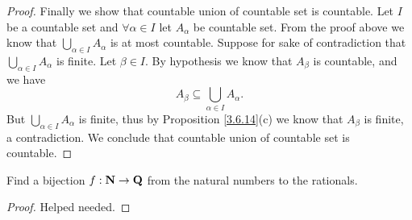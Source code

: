 \begin{proof}
    Finally we show that countable union of countable set is countable.
    Let \(I\) be a countable set and \(\forall \alpha \in I\) let \(A_{\alpha}\) be countable set.
    From the proof above we know that \(\bigcup_{\alpha \in I} A_{\alpha}\) is at most countable.
    Suppose for sake of contradiction that \(\bigcup_{\alpha \in I} A_{\alpha}\) is finite.
    Let \(\beta \in I\).
    By hypothesis we know that \(A_{\beta}\) is countable, and we have
    \[
        A_{\beta} \subseteq \bigcup_{\alpha \in I} A_{\alpha}.
    \]
    But \(\bigcup_{\alpha \in I} A_{\alpha}\) is finite, thus by Proposition \ref{3.6.14}(c) we know that \(A_{\beta}\) is finite, a contradiction.
    We conclude that countable union of countable set is countable.
\end{proof}

\begin{exercise}\label{ex 8.1.10}
    Find a bijection \(f : \mathbf{N} \to \mathbf{Q}\) from the natural numbers to the rationals.
\end{exercise}

\begin{proof}
    Helped needed.
\end{proof}